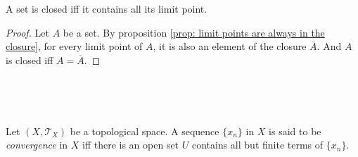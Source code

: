 \begin{proposition}
	A set is closed iff it contains all its limit point.
	
	\begin{proof}
		Let $A$ be a set. By proposition \ref{prop: limit points are always in the closure}, for every limit point of $A$, it is also an element of the closure $\overline A$. And $A$ is closed iff $A = \overline A$.
	\end{proof}
\end{proposition}


\

\

\begin{definition}
	\label{def: convergent sequences}
	Let $(X, \mathcal T_X)$ be a topological space. A sequence $\{x_n\}$ in $X$ is said to be \textit{convergence} in $X$ iff there is an open set $U$ contains all but finite terms of $\{x_n\}$.
\end{definition}
